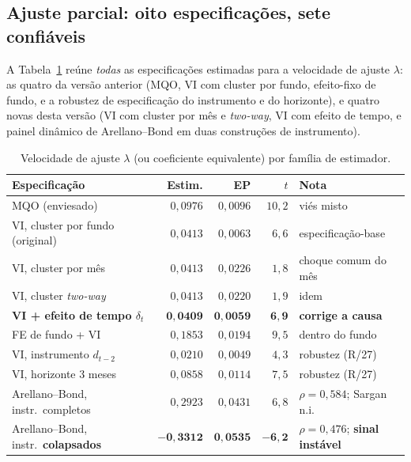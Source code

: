\documentclass[12pt,a4paper]{article}
\begin{document}
\subsection{Ajuste parcial: oito especificações, sete confiáveis}
\label{sec:paest}

A Tabela~\ref{tab:lambda_full} reúne \emph{todas} as especificações estimadas para a velocidade
de ajuste $\lambda$: as quatro da versão anterior (MQO, VI com cluster por fundo, efeito-fixo de
fundo, e a robustez de especificação do instrumento e do horizonte), e quatro novas desta versão
(VI com cluster por mês e \emph{two-way}, VI com efeito de tempo, e painel dinâmico de
Arellano--Bond em duas construções de instrumento).

\begin{table}[h]\centering\footnotesize
\caption{Velocidade de ajuste $\lambda$ (ou coeficiente equivalente) por família de estimador.}
\label{tab:lambda_full}
\begin{tabular}{@{}lrrrl@{}}
\toprule
Especificação & Estim. & EP & $t$ & Nota \\
\midrule
MQO (enviesado)                     & $0{,}0976$ & $0{,}0096$ & $10{,}2$ & viés misto \\
VI, cluster por fundo (original)    & $0{,}0413$ & $0{,}0063$ & $6{,}6$  & especificação-base \\
VI, cluster por mês                 & $0{,}0413$ & $0{,}0226$ & $1{,}8$  & choque comum do mês \\
VI, cluster \emph{two-way}          & $0{,}0413$ & $0{,}0220$ & $1{,}9$  & idem \\
\textbf{VI + efeito de tempo $\delta_t$} & $\mathbf{0{,}0409}$ & $\mathbf{0{,}0059}$ & $\mathbf{6{,}9}$ & \textbf{corrige a causa} \\
FE de fundo + VI                    & $0{,}1853$ & $0{,}0194$ & $9{,}5$  & dentro do fundo \\
VI, instrumento $d_{t-2}$           & $0{,}0210$ & $0{,}0049$ & $4{,}3$  & robustez (R/27) \\
VI, horizonte 3 meses               & $0{,}0858$ & $0{,}0114$ & $7{,}5$  & robustez (R/27) \\
Arellano--Bond, instr.\ completos   & $0{,}2923$ & $0{,}0431$ & $6{,}8$ & $\rho=0{,}584$; Sargan n.i. \\
Arellano--Bond, instr.\ \textbf{colapsados} & $\mathbf{-0{,}3312}$ & $\mathbf{0{,}0535}$ & $\mathbf{-6{,}2}$ & $\rho=0{,}476$; \textbf{sinal instável} \\
\bottomrule
\end{tabular}

\end{table}
\end{document}
